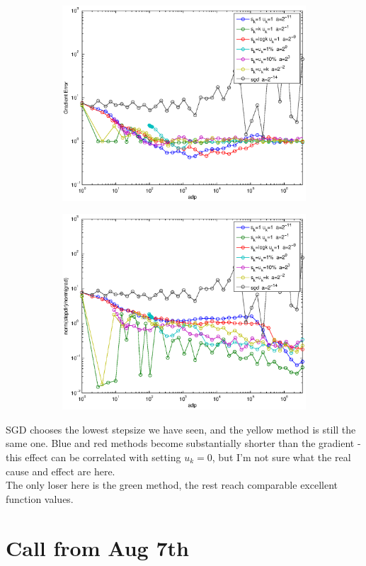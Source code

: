 \documentclass[12pt]{article}
\begin{document}
\begin{figure}[H]
	\begin{subfigure}[b]{.5\linewidth}
		        \includegraphics[width=4in]{Figures/16-3-3.eps}
	\end{subfigure}%
	\begin{subfigure}[b]{.5\linewidth}
		        \includegraphics[width=4in]{Figures/16-3-4.eps}
	\end{subfigure}%
	\end{figure}
	
	SGD chooses the lowest stepsize we have seen, and the yellow method is still the same one.
	Blue and red methods become substantially shorter than the gradient - this effect can be correlated with setting $u_k=0$, but I'm not sure what the real cause and effect are here. \\
	The only loser here is the green method, the rest reach comparable excellent function values. 
	
	\newpage 
	
	\section{Call from Aug 7th}
	
\end{document}
